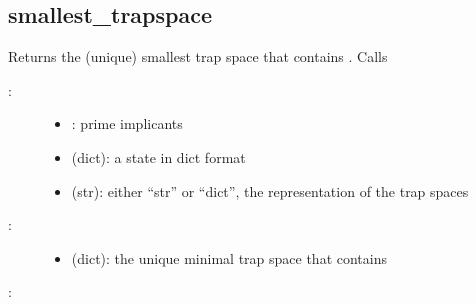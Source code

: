 \documentclass[letterpaper,10pt,english]{sphinxmanual}
\begin{document}
\subsection{smallest\_trapspace}
\label{\detokenize{AspSolver:id4}}\label{\detokenize{AspSolver:smallest-trapspace}}

\begin{fulllineitems}
\label{\detokenize{AspSolver:PyBoolNet.AspSolver.smallest_trapspace}}
Returns the (unique) smallest trap space that contains .
Calls {\hyperref[\detokenize{AspSolver:trapspaces-that-contain-state}]{}}
\begin{description}
\item[{:}] \leavevmode\begin{itemize}
\item {} 
: prime implicants

\item {} 
 (dict): a state in dict format

\item {} 
 (str): either “str” or “dict”, the representation of the trap spaces

\end{itemize}

\item[{:}] \leavevmode\begin{itemize}
\item {} 
 (dict): the unique minimal trap space that contains 

\end{itemize}

\end{description}

:

\begin{sphinxVerbatim}[commandchars=\\\{\}]
 
\end{sphinxVerbatim}

\end{fulllineitems}
\end{document}
